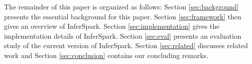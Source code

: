 %

The remainder of this paper is organized as follows: 
Section \ref{sec:background} presents the essential background for this paper.
Section \ref{sec:framework} then gives an overview of InferSpark.
Section \ref{sec:implementation} gives the implementation details of InferSpark.
Section \ref{sec:eval} presents an evaluation study of the current version of InferSpark.
Section \ref{sec:related} discusses related work 
and Section \ref{sec:conclusion} contains our concluding remarks.



%



